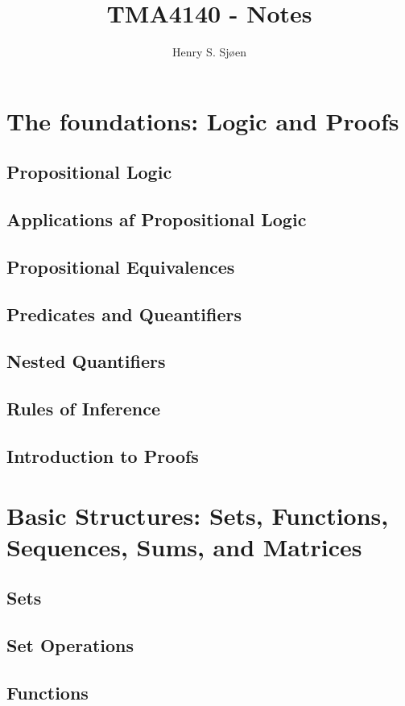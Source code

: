 \documentclass[12pt]{article}
\author{Henry S. Sjøen}
\title{
  \textbf{TMA4140 - Notes}}
\begin{document}
    \maketitle
    \thispagestyle{empty}
    \pagebreak
    \tableofcontents
    \pagebreak

    \section{The foundations: Logic and Proofs}
    \subsection{Propositional Logic}    
    \subsection{Applications af Propositional Logic}
    \subsection{Propositional Equivalences}
    \subsection{Predicates and Queantifiers}
    \subsection{Nested Quantifiers}
    \subsection{Rules of Inference}
    \subsection{Introduction to Proofs}

    \section{Basic Structures: Sets, Functions, Sequences, Sums, and Matrices}
    \subsection{Sets}
    \subsection{Set Operations}
    \subsection{Functions}
\end{document}

